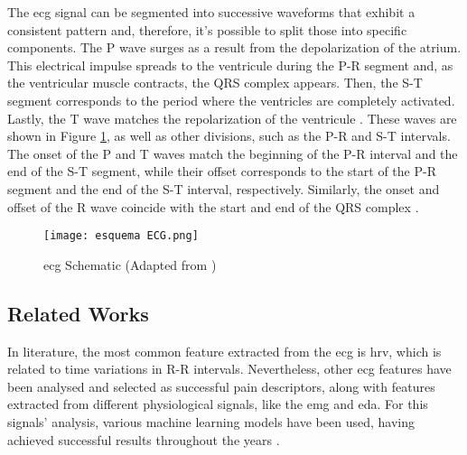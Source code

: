 The \ac{ecg} signal can be segmented into successive waveforms that exhibit a consistent pattern and, therefore, it's possible to split those into specific components. The P wave surges as a result from the depolarization of the atrium. This electrical impulse spreads to the ventricule during the P-R segment and, as the ventricular muscle contracts, the QRS complex appears. Then, the S-T segment corresponds to the period where the ventricles are completely activated. Lastly, the T wave matches the repolarization of the ventricule \cite{hampton2024ecg}. These waves are shown in Figure \ref{fig:esquemaecg}, as well as other divisions, such as the P-R and S-T intervals. The onset of the P and T waves match the beginning of the P-R interval and the end of the S-T segment, while their offset corresponds to the start of the P-R segment and the end of the S-T interval, respectively. Similarly, the onset and offset of the R wave coincide with the start and end of the QRS complex \cite{Zhang2024}.

\begin{figure}[h!]
    \centering
    \texttt{[image: esquema ECG.png]}
    \caption{\ac{ecg} Schematic (Adapted from \cite{Dogan2023})}
    \label{fig:esquemaecg}
\end{figure}


\subsection{Related Works}


In literature, the most common feature extracted from the \ac{ecg} is \ac{hrv}, which is related to time variations in R-R intervals. Nevertheless, other \ac{ecg} features have been analysed and selected as successful pain descriptors, along with features extracted from different physiological signals, like the \ac{emg} and \ac{eda}. For this signals' analysis, various machine learning models have been used, having achieved successful results throughout the years \cite{Moscato2022}\cite{Pais2025}.

